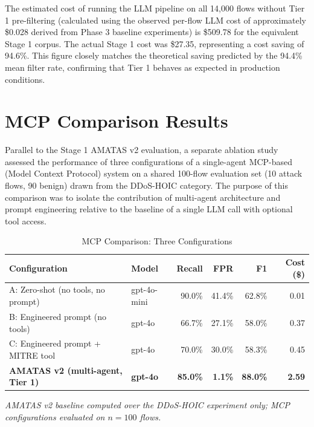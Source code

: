 The estimated cost of running the LLM pipeline on all 14,000 flows without Tier 1 pre-filtering (calculated using the observed per-flow LLM cost of approximately \$0.028 derived from Phase 3 baseline experiments) is \$509.78 for the equivalent Stage 1 corpus. The actual Stage 1 cost was \$27.35, representing a cost saving of 94.6\%. This figure closely matches the theoretical saving predicted by the 94.4\% mean filter rate, confirming that Tier 1 behaves as expected in production conditions.

\section{MCP Comparison Results}
\label{sec:mcp-comparison}

Parallel to the Stage 1 AMATAS v2 evaluation, a separate ablation study assessed the performance of three configurations of a single-agent MCP-based (Model Context Protocol) system on a shared 100-flow evaluation set (10 attack flows, 90 benign) drawn from the DDoS-HOIC category. The purpose of this comparison was to isolate the contribution of multi-agent architecture and prompt engineering relative to the baseline of a single LLM call with optional tool access.

\begin{table}[H]
\centering
\caption{MCP Comparison: Three Configurations}
\label{tab:mcp-comparison}
\footnotesize
\begin{tabular}{l l r r r r}
\toprule
Configuration & Model & Recall & FPR & F1 & Cost (\$) \\
\midrule
A: Zero-shot (no tools, no prompt) & gpt-4o-mini & 90.0\% & 41.4\% & 62.8\% & 0.01 \\
B: Engineered prompt (no tools) & gpt-4o & 66.7\% & 27.1\% & 58.0\% & 0.37 \\
C: Engineered prompt + MITRE tool & gpt-4o & 70.0\% & 30.0\% & 58.3\% & 0.45 \\
\textbf{AMATAS v2 (multi-agent, Tier 1)} & \textbf{gpt-4o} & \textbf{85.0\%} & \textbf{1.1\%} & \textbf{88.0\%} & \textbf{2.59} \\
\bottomrule
\end{tabular}

\vspace{0.5em}
\noindent\textit{AMATAS v2 baseline computed over the DDoS-HOIC experiment only; MCP configurations evaluated on $n=100$ flows.}
\end{table}

